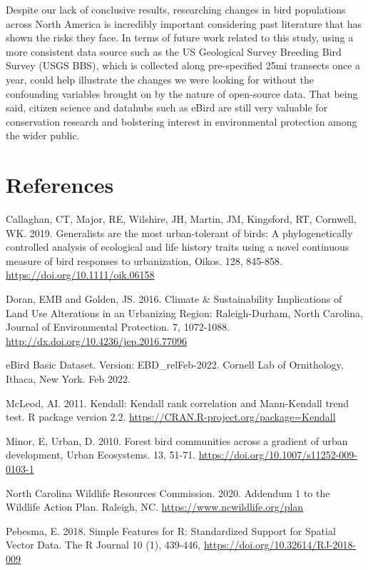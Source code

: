 \documentclass[
  12pt,
]{article}
\begin{document}
Despite our lack of conclusive results, researching changes in bird
populations across North America is incredibly important considering
past literature that has shown the risks they face. In terms of future
work related to this study, using a more consistent data source such as
the US Geological Survey Breeding Bird Survey (USGS BBS), which is
collected along pre-specified 25mi transects once a year, could help
illustrate the changes we were looking for without the confounding
variables brought on by the nature of open-source data. That being said,
citizen science and datahubs such as eBird are still very valuable for
conservation research and bolstering interest in environmental
protection among the wider public.

\newpage

\hypertarget{references}{%
\section{References}\label{references}}

Callaghan, CT, Major, RE, Wilshire, JH, Martin, JM, Kingsford, RT,
Cornwell, WK. 2019. Generalists are the most urban‐tolerant of birds: A
phylogenetically controlled analysis of ecological and life history
traits using a novel continuous measure of bird responses to
urbanization, Oikos. 128, 845-858.
\url{https://doi.org/10.1111/oik.06158}

Doran, EMB and Golden, JS. 2016. Climate \& Sustainability Implications
of Land Use Alterations in an Urbanizing Region: Raleigh-Durham, North
Carolina, Journal of Environmental Protection. 7, 1072-1088.
\url{http://dx.doi.org/10.4236/jep.2016.77096}

eBird Basic Dataset. Version: EBD\_relFeb-2022. Cornell Lab of
Ornithology, Ithaca, New York. Feb 2022.

McLeod, AI. 2011. Kendall: Kendall rank correlation and Mann-Kendall
trend test. R package version 2.2.
\url{https://CRAN.R-project.org/package=Kendall}

Minor, E, Urban, D. 2010. Forest bird communities across a gradient of
urban development, Urban Ecosystems. 13, 51-71.
\url{https://doi.org/10.1007/s11252-009-0103-1}

North Carolina Wildlife Resources Commission. 2020. Addendum 1 to the
Wildlife Action Plan. Raleigh, NC. \url{https://www.ncwildlife.org/plan}

Pebesma, E. 2018. Simple Features for R: Standardized Support for
Spatial Vector Data. The R Journal 10 (1), 439-446,
\url{https://doi.org/10.32614/RJ-2018-009}
\end{document}
